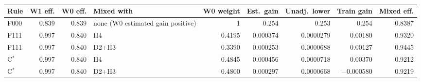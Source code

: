 \begin{tabular}{@{}lrrlrrrrr@{}}\toprule
Rule & W1 eff. & W0 eff. & Mixed with & W0 weight & Est.\ gain & Unadj.\ lower & Train gain & Mixed eff. \\\midrule
F000 & 0.839 & 0.839 & none (W0 estimated gain positive) & 1 & 0.254 & 0.253 & 0.254 & 0.8387 \\
F111 & 0.997 & 0.840 & H4 & 0.4195 & 0.000374 & 0.0000279 & 0.00180 & 0.9320 \\
F111 & 0.997 & 0.840 & D2+H3 & 0.3390 & 0.000253 & 0.0000688 & 0.00127 & 0.9445 \\
C$^*$ & 0.997 & 0.840 & H4 & 0.4845 & 0.000456 & 0.0000718 & 0.00370 & 0.9212 \\
C$^*$ & 0.997 & 0.840 & D2+H3 & 0.4800 & 0.000297 & 0.0000668 & \ensuremath{-0.000580} & 0.9219 \\
\bottomrule\end{tabular}
